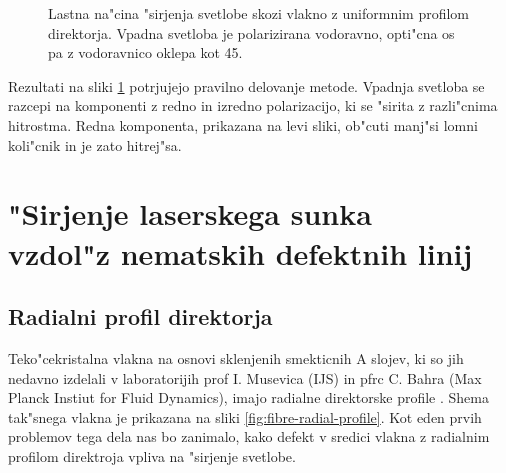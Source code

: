 \documentclass[12pt,twoside,openright,final]{report}
\begin{document}
\begin{figure}[!htbp]
 \centering
 \caption{Lastna na"cina "sirjenja svetlobe skozi vlakno z uniformnim profilom direktorja. Vpadna svetloba je polarizirana vodoravno, opti"cna os pa z vodoravnico oklepa kot 45\degree. }
 \label{fig:pulse-0-mode}
\end{figure}

Rezultati na sliki \ref{fig:pulse-0-mode} potrjujejo pravilno delovanje metode. 
Vpadnja svetloba se razcepi na komponenti z redno in izredno polarizacijo, ki se "sirita z razli"cnima hitrostma. 
Redna komponenta, prikazana na levi sliki, ob"cuti manj"si lomni koli"cnik in je zato hitrej"sa. 

\chapter["Sirjenje laserskega sunka vzdol"z nematskih defektnih linij]{\texorpdfstring{"Sirjenje laserskega sunka \\[.3cm] vzdol"z nematskih defektnih linij}{"Sirjenje laserskega sunka vzdol"z nematskih defektnih linij}}

\section{Radialni profil direktorja}

Teko"cekristalna vlakna na osnovi sklenjenih smekticnih A slojev, ki so jih nedavno izdelali v laboratorijih prof I. Musevica (IJS) in pfrc C. Bahra (Max Planck Instiut for Fluid Dynamics), imajo radialne direktorske profile \cite{peddireddy}. 
Shema tak"snega vlakna je prikazana na sliki \ref{fig:fibre-radial-profile}. 
Kot eden prvih problemov tega dela nas bo zanimalo, kako defekt v sredici vlakna z radialnim profilom direktroja vpliva na "sirjenje svetlobe. 
\end{document}
